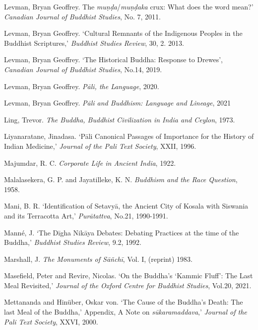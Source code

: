 \label{footprints_split_022.html_Levmanux202011}
Levman, Bryan Geoffrey. The \emph{muṇḍa}/\emph{muṇḍaka} crux: What does
the word mean?' \emph{Canadian Journal of Buddhist Studies}, No. 7,
2011.

\label{footprints_split_022.html_Levmanux202013}
Levman, Bryan Geoffrey. `Cultural Remnants of the Indigenous Peoples in
the Buddhist Scriptures,' \emph{Buddhist Studies Review}, 30, 2. 2013.

\label{footprints_split_022.html_Levmanux202019}
Levman, Bryan Geoffrey. `The Historical Buddha: Response to Drewes',
\emph{Canadian Journal of Buddhist Studies}, No.14, 2019.

\label{footprints_split_022.html_Levmanux202020}
Levman, Bryan Geoffrey. \emph{Pāli, the Language}, 2020.

Levman, Bryan Geoffrey. \emph{Pāli and Buddhism: Language and Lineage},
2021

Ling, Trevor. \emph{The Buddha, Buddhist Civilization in India and
Ceylon}, 1973.

Liyanaratane, Jinadasa. `Pāli Canonical Passages of Importance for the
History of Indian Medicine,' \emph{Journal of the Pali Text Society},
XXII, 1996.

\label{footprints_split_022.html_Majumdarux201922}
Majumdar, R. C. \emph{Corporate Life in Ancient India}, 1922.

\label{footprints_split_022.html_Malalasekeraux20Jayatillekeux201958}
Malalasekera, G. P. and Jayatilleke, K. N. \emph{Buddhism and the Race
Question}, 1958.

\label{footprints_split_022.html_Maniux201990-91}
Mani, B. R. `Identification of Setavyā, the Ancient City of Kosala with
Siswania and its Terracotta Art,' \emph{Purātattva}, No.21, 1990-1991.

Manné, J. `The Dīgha Nikāya Debates: Debating Practices at the time of
the Buddha,' \emph{Buddhist Studies Review}, 9.2, 1992.

\label{footprints_split_022.html_Marshallux201983}
Marshall, J. \emph{The Monuments of Sāñchī}, Vol. I, (reprint) 1983.

\label{footprints_split_022.html_Masefieldux20andux20Revireux202021}
Masefield, Peter and Revire, Nicolas. `On the Buddha's `Kammic Fluff':
The Last Meal Revisited,' \emph{Journal of the Oxford Centre for
Buddhist Studies}, Vol.20, 2021.

\label{footprints_split_022.html_Mettanandaux20andux20Hinuxfcberux202000}
Mettananda and Hinüber, Oskar von. `The Cause of the Buddha's Death: The
last Meal of the Buddha,' Appendix, A Note on \emph{sūkaramaddava},'
\emph{Journal of the Pali Text Society}, XXVI, 2000.

